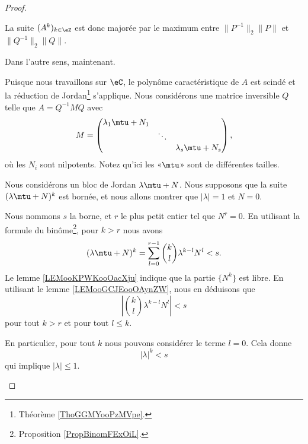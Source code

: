 \begin{proof}
\begin{subproof}
		La suite \( (A^k)_{k\in \eZ}\) est donc majorée par le maximum entre \( \| P^{-1} \|_2\| P \|\) et \( \| Q^{-1} \|_2\| Q \|\).
	\end{subproof}

	\begin{center}
		Dans l'autre sens, maintenant.
	\end{center}

	Puisque nous travaillons sur \( \eC\), le polynôme caractéristique de \( A\) est scindé et la réduction de Jordan\footnote{Théorème \ref{ThoGGMYooPzMVpe}.} s'applique. Nous considérons une matrice inversible \( Q\) telle que \( A=Q^{-1} MQ\) avec
	\begin{equation}
		M=\begin{pmatrix}
			\lambda_1\mtu+N_1 &        &                   \\
			                  & \ddots &                   \\
			                  &        & \lambda_s\mtu+N_s
		\end{pmatrix},
	\end{equation}
	où les \( N_i\) sont nilpotents. Notez qu'ici les «\( \mtu\)» sont de différentes tailles.

	\begin{subproof}
		Nous considérons un bloc de Jordan \( \lambda\mtu+N\). Nous supposons que la suite \( (\lambda\mtu+N)^k\) est bornée, et nous allons montrer que \( | \lambda |=1\) et \( N=0\).

		Nous nommons \( s\) la borne, et \( r\) le plus petit entier tel que \( N^r=0\). En utilisant la formule du binôme\footnote{Proposition \ref{PropBinomFExOiL}.}, pour \( k>r\) nous avons
		\begin{equation}
			(\lambda\mtu+N)^k=\sum_{l=0}^{r-1}\binom{ k }{ l }\lambda^{k-l}N^l<s.
		\end{equation}
		Le lemme \ref{LEMooKPWKooOacXju} indique que la partie \( \{ N^k \}\) est libre. En utilisant le lemme \ref{LEMooGCJEooOAynZW}, nous en déduisons que
		\begin{equation}    \label{EQooZWGCooGEsobY}
			\left| \binom{ k }{ l }\lambda^{k-l}N^l \right|<s
		\end{equation}
		pour tout \( k>r\) et pour tout \( l\leq k\).

		En particulier, pour tout \( k\) nous pouvons considérer le terme \( l=0\). Cela donne
		\begin{equation}
			| \lambda |^k<s
		\end{equation}
		qui implique \( | \lambda |\leq 1\).


\end{subproof}
\end{proof}
